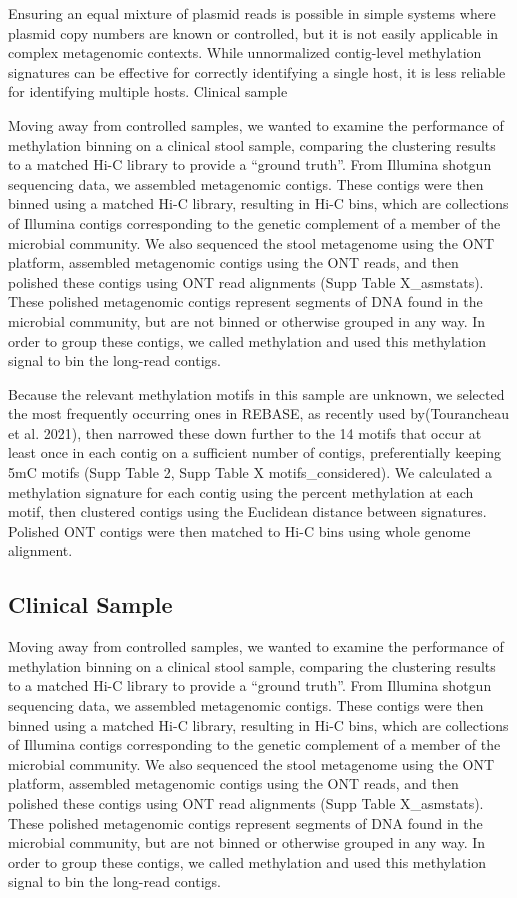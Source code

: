 Ensuring an equal mixture of plasmid reads is possible in simple systems where plasmid copy numbers are known or controlled, but it is not easily applicable in complex metagenomic contexts. While unnormalized contig-level methylation signatures can be effective for correctly identifying a single host, it is less reliable for identifying multiple hosts.
Clinical sample

Moving away from controlled samples, we wanted to examine the performance of methylation binning on a clinical stool sample, comparing the clustering results to a matched Hi-C library to provide a “ground truth”. From Illumina shotgun sequencing data, we assembled metagenomic contigs. These contigs were then binned using a matched Hi-C library, resulting in Hi-C bins, which are collections of Illumina contigs corresponding to the genetic complement of a member of the microbial community. We also sequenced the stool metagenome using the ONT platform, assembled metagenomic contigs using the ONT reads, and then polished these contigs using ONT read alignments (Supp Table X_asmstats). These polished metagenomic contigs represent segments of DNA found in the microbial community, but are not binned or otherwise grouped in any way. In order to group these contigs, we called methylation and used this methylation signal to bin the long-read contigs.

Because the relevant methylation motifs in this sample are unknown, we selected the most frequently occurring ones in REBASE, as recently used by(Tourancheau et al. 2021), then narrowed these down further to the 14 motifs that occur at least once in each contig on a sufficient number of contigs, preferentially keeping 5mC motifs  (Supp Table 2, Supp Table X motifs_considered). We calculated a methylation signature for each contig using the percent methylation at each motif, then clustered contigs using the Euclidean distance between signatures. Polished ONT contigs were then matched to Hi-C bins using whole genome alignment.

\subsection{Clinical Sample}
\label{sec:mdr}

Moving away from controlled samples, we wanted to examine the performance of methylation binning on a clinical stool sample, comparing the clustering results to a matched Hi-C library to provide a “ground truth”. From Illumina shotgun sequencing data, we assembled metagenomic contigs. These contigs were then binned using a matched Hi-C library, resulting in Hi-C bins, which are collections of Illumina contigs corresponding to the genetic complement of a member of the microbial community. We also sequenced the stool metagenome using the ONT platform, assembled metagenomic contigs using the ONT reads, and then polished these contigs using ONT read alignments (Supp Table X_asmstats). These polished metagenomic contigs represent segments of DNA found in the microbial community, but are not binned or otherwise grouped in any way. In order to group these contigs, we called methylation and used this methylation signal to bin the long-read contigs.

